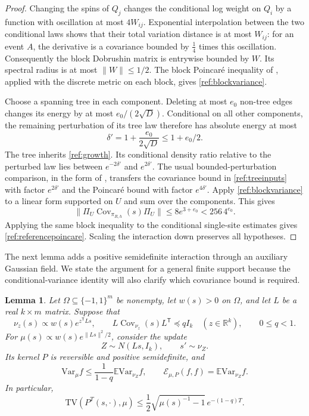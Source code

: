 \documentclass[11pt]{article}
\newcommand{\TV}{\mathrm{TV}}
\newcommand{\Var}{\mathrm{Var}}
\def\E{\mathbb{E}}
\def\R{\mathbb{R}}
\newtheorem{lemma}[thm]{Lemma}
\numberwithin{equation}{section}
\begin{document}
\begin{proof}
Changing the spins of $Q_j$ changes the conditional log weight on $Q_i$ by a function with oscillation at most $4W_{ij}$. Exponential interpolation between the two conditional laws shows that their total variation distance is at most $W_{ij}$: for an event $A$, the derivative is a covariance bounded by $\frac14$ times this oscillation. Consequently the block Dobrushin matrix is entrywise bounded by $W$. Its spectral radius is at most $\|W\|\le1/2$. The block Poincar\'e inequality of \cite[Theorem~2.1]{Wu06}, applied with the discrete metric on each block, gives \eqref{ref:blockvariance}.

Choose a spanning tree in each component. Deleting at most $e_0$ non-tree edges changes its energy by at most $e_0/(2\sqrt D)$. Conditional on all other components, the remaining perturbation of its tree law therefore has absolute energy at most
\[
 \delta'=1+\frac{e_0}{2\sqrt D}\le1+e_0/2.
\]
The tree inherits \eqref{ref:growth}. Its conditional density ratio relative to the perturbed law lies between $e^{-2\delta'}$ and $e^{2\delta'}$. The usual bounded-perturbation comparison, in the form of \cite[Lemma~3.8]{LMRW24}, transfers the covariance bound in \eqref{ref:treeinputs} with factor $e^{2\delta'}$ and the Poincar\'e bound with factor $e^{4\delta'}$. Apply \eqref{ref:blockvariance} to a linear form supported on $U$ and sum over the components. This gives
\[
 \|\Pi_U\operatorname{Cov}_{\pi_{R,h}}(s)\Pi_U\|
 \le 8e^{3+e_0}<256\,4^{e_0}.
\]
Applying the same block inequality to the conditional single-site estimates gives \eqref{ref:referencepoincare}. Scaling the interaction down preserves all hypotheses.
\end{proof}

The next lemma adds a positive semidefinite interaction through an auxiliary Gaussian field. We state the argument for a general finite support because the conditional-variance identity will also clarify which covariance bound is required.

\begin{lemma}\label{ref:gaussian}
Let $\Omega\subseteq\{-1,1\}^m$ be nonempty, let $w(s)>0$ on $\Omega$, and let $L$ be a real $k\times m$ matrix. Suppose that
\[
 \nu_z(s)\propto w(s)e^{z^{\mathsf T}Ls},\qquad
 L\operatorname{Cov}_{\nu_z}(s)L^{\mathsf T}\preceq qI_k
 \quad(z\in\R^k),\qquad 0\le q<1.
\]
For $\mu(s)\propto w(s)e^{\|Ls\|^2/2}$, consider the update
\[
 Z\sim N(Ls,I_k),\qquad s'\sim\nu_Z.
\]
Its kernel $P$ is reversible and positive semidefinite, and
\begin{equation}\label{ref:gaussianvariance}
 \Var_\mu f\le\frac1{1-q}\E\Var_{\nu_Z}f,
 \qquad
 \mathcal E_{\mu,P}(f,f)=\E\Var_{\nu_Z}f.
\end{equation}
In particular,
\[
 \TV(P^T(s,\cdot),\mu)
 \le\frac12\sqrt{\mu(s)^{-1}-1}\,e^{-(1-q)T}.
\]
\end{lemma}
\end{document}
